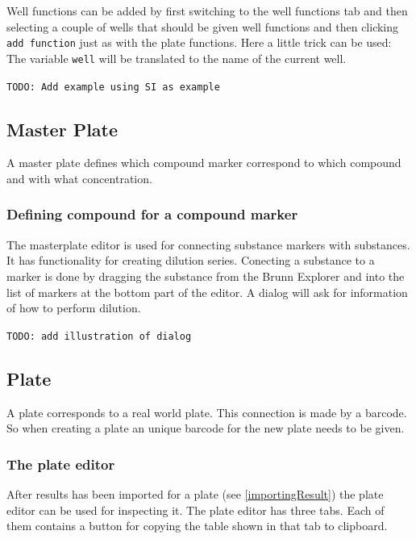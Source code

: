 \documentclass[a4paper,10pt]{article}
\begin{document}
                Well functions can be added by first switching to the well
                functions tab and then selecting a couple of wells that should
                be given well functions and then clicking \texttt{add function}
                just as with the plate functions. Here a little trick can be
                used: The variable \texttt{well} will be translated to the name
                of the current well. 

                \texttt{TODO: Add example using SI as example}
        \subsection{Master Plate}
            A master plate defines which compound marker correspond to which
            compound and with what concentration.
            
            \subsubsection{Defining compound for a compound marker}
                The masterplate editor is used for connecting substance markers
                with substances. It has functionality for creating dilution
                series. Conecting a substance to a marker is done by dragging
                the substance from the Brunn Explorer and into the list of
                markers at the bottom part of the editor. A dialog will 
                ask for information of how to perform dilution.

                \texttt{TODO: add illustration of dialog}
        \subsection{Plate}
            A plate corresponds to a real world plate. This connection is made
            by a barcode. So when creating a plate an unique barcode for the new
            plate needs to be given. 

            \subsubsection{The plate editor}
                After results has been imported for a plate (see
                \ref{importingResult}) the plate editor can be used for
                inspecting it. The plate editor has three tabs. Each of
                them contains a button for copying the table shown in that tab
                to clipboard.
\end{document}
